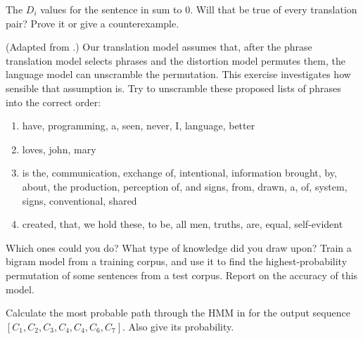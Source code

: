\begin{exercise}
The \(D_i\) values for the sentence in  sum to 0.  Will that be true
of every translation pair?  Prove it or give a counterexample.
\end{exercise} 

\begin{exercise}
(Adapted from .) Our translation model assumes
that, after the phrase translation model selects phrases and the
distortion model permutes them, the language model can unscramble the
permutation. This exercise investigates how sensible that assumption
is. Try to unscramble these proposed lists of phrases into the correct order:
\begin{enumerate}
\item have, programming, a, seen, never, I, language, better
\item loves, john, mary
\item is the, communication, exchange of, intentional, information brought, 
by, about, the production, perception of, and
signs, from, drawn, a, of, system, signs, conventional, shared
\item created, that, we hold these, to be, all men, truths, are, equal, self-evident
\end{enumerate}
Which ones could you do? What type of knowledge did you draw upon?
Train a bigram model from a training corpus, and use it to find the
highest-probability permutation of some sentences from a test
corpus.  Report on the accuracy of this model.
\end{exercise} 




\begin{exercise}
Calculate the most probable path through the HMM in  for
the output sequence \([C_1,C_2,C_3,C_4,C_4,C_6,C_7]\).  Also give its probability.
\end{exercise} 





